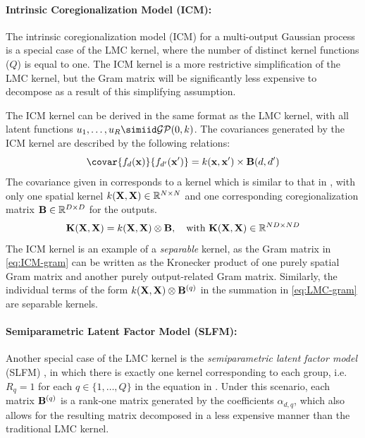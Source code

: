 \documentclass[10pt]{article}
\newcommand{\calGP}{\mathcal{GP}}
\begin{document}
\paragraph{Intrinsic Coregionalization Model (ICM):} The intrinsic coregionalization model (ICM) for a multi-output Gaussian process is a special case of the LMC kernel, where the number of distinct kernel functions ($Q$) is equal to one. The ICM kernel is a more restrictive simplification of the LMC kernel, but the Gram matrix will be significantly less expensive to decompose as a result of this simplifying assumption.

The ICM kernel can be derived in the same format as the LMC kernel, with all latent functions $u_{1}, \dots, u_{R} \simiid \calGP(0,k)$. The covariances generated by the ICM kernel are described by the following relations:
\begin{equation}
    \label{eq:ICM-covariance}
    \covar{f_{d}(\bfx)}{f_{d'}(\bfx')} = k(\bfx, \bfx') \times \bfB(d, d')
\end{equation}
The covariance given in  corresponds to a kernel which is similar to that in , with only one spatial kernel $k(\mathbf{X}, \mathbf{X}) \in \mathbb{R}^{N \times N}$ and one corresponding coregionalization matrix $\mathbf{B} \in \mathbb{R}^{D \times D}$ for the outputs. 
\begin{equation}
    \label{eq:ICM-gram}
    \bfK(\bfX, \bfX) = k(\bfX, \bfX) \otimes \bfB, \quad \textrm{with}\ \bfK(\bfX, \bfX) \in \bbR^{ND \times ND}
\end{equation}
The ICM kernel is an example of a \emph{separable} kernel, as the Gram matrix in \ref{eq:ICM-gram} can be written as the Kronecker product of one purely spatial Gram matrix and another purely output-related Gram matrix. Similarly, the individual terms of the form $k(\mathbf{X}, \mathbf{X}) \otimes \mathbf{B}^{(q)}$ in the summation in \ref{eq:LMC-gram} are separable kernels.

\paragraph{Semiparametric Latent Factor Model (SLFM):} Another special case of the LMC kernel is the \emph{semiparametric latent factor model} (SLFM) \citep{Bonilla-Multitask-GP-2007}, in which there is exactly one kernel corresponding to each group, i.e. $R_{q} = 1$ for each $q \in \{1, \dots, Q\}$ in the equation in . Under this scenario, each matrix $\mathbf{B}^{(q)}$ is a rank-one matrix generated by the coefficients ${\alpha}_{d,q}$, which also allows for the resulting matrix decomposed in a less expensive manner than the traditional LMC kernel.
\end{document}
